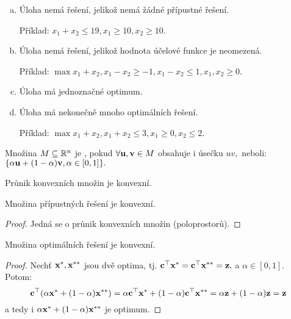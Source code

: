 \begin{remark}
    \leavevmode
    \begin{enumerate}[a.]
        \item Úloha nemá řešení, jelikož nemá žádné přípustné řešení.

            Příklad: $x_1 + x_2 \leq 19, x_1 \geq 10, x_2 \geq 10.$

        \item Úloha nemá řešení, jelikož hodnota účelové funkce je neomezená.

            Příklad: $\max x_1 + x_2, x_1 - x_2 \geq -1, x_1 - x_2 \leq 1,
            x_1,x_2 \geq 0.$

        \item Úloha má jednoznačné optimum.

        \item Úloha má nekonečně mnoho optimálních řešení.

            Příklad: $\max x_1 + x_2, x_1 + x_2 \leq 3, x_1 \geq 0, x_2 \leq 2.$
    \end{enumerate}
\end{remark}

\begin{definition}
    Množina $M \subseteq \mathbb{R}^n$ je , pokud $\forall \mathbf{u},\mathbf{v} \in M$
    obsahuje i úsečku $uv,$ neboli: $\{\alpha\mathbf{u} + (1-\alpha)\mathbf{v}, \alpha \in
    [0,1]\}.$
\end{definition}

\begin{observation}
    Průnik konvexních množin je konvexní.
\end{observation}

\begin{observation}
    Množina přípustných řešení je konvexní.
\end{observation}

\begin{proof}
    Jedná se o průnik konvexních množin (poloprostorů).
\end{proof}

\begin{observation}
    Množina optimálních řešení je konvexní.
\end{observation}

\begin{proof}
    Nechť $\mathbf{x}^*, \mathbf{x}^{**}$ jsou dvě optima, tj. $\mathbf{c}^\top\mathbf{x}^* = 
    \mathbf{c}^\top\mathbf{x}^{**} = \mathbf{z},$ a $\alpha \in [0,1].$ Potom:
    \[
        \mathbf{c}^\top(\alpha\mathbf{x}^* + (1-\alpha)\mathbf{x}^{**}) = \alpha\mathbf{c}^\top\mathbf{x}^*
        + (1 - \alpha)\mathbf{c}^\top\mathbf{x}^{**} = \alpha\mathbf{z} + (1-\alpha)\mathbf{z} = \mathbf{z}
    \]
    a tedy i $\alpha\mathbf{x}^* + (1-\alpha)\mathbf{x}^{**}$ je optimum.
\end{proof}
